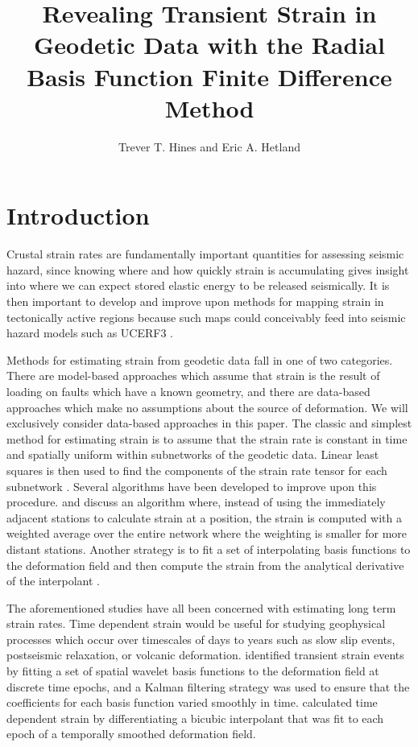 \documentclass[10pt,a4paper]{article}
\title{Revealing Transient Strain in Geodetic Data with the Radial Basis Function Finite Difference Method}
\author{Trever T. Hines and Eric A. Hetland}
\begin{document}
\maketitle


\section{Introduction}\label{sec:Introduction}
Crustal strain rates are fundamentally important quantities for assessing seismic hazard, since knowing where and how quickly strain is accumulating gives insight into where we can expect stored elastic energy to be released seismically.  It is then important to develop and improve upon methods for mapping strain in tectonically active regions because such maps could conceivably feed into seismic hazard models such as UCERF3 \citep{Field2014}. 

Methods for estimating strain from geodetic data fall in one of two categories.  There are model-based approaches which assume that strain is the result of loading on faults which have a known geometry, and there are data-based approaches which make no assumptions about the source of deformation.  We will exclusively consider data-based approaches in this paper.  The classic and simplest method for estimating strain is to assume that the strain rate is constant in time and spatially uniform within subnetworks of the geodetic data.  Linear least squares is then used to find the components of the strain rate tensor for each subnetwork \citep[e.g][]{Frank1966,Prescott1976,Savage1986,Feigl1990,Murray2000}. Several algorithms have been developed to improve upon this procedure. \citet{Shen1996} and \citet{Shen2015} discuss an algorithm where, instead of using the immediately adjacent stations to calculate strain at a position, the strain is computed with a weighted average over the entire network where the weighting is smaller for more distant stations.  Another strategy is to fit a set of interpolating basis functions to the deformation field and then compute the strain from the analytical derivative of the interpolant \citep[e.g.][]{Beavan2001,Tape2009,Sandwell2016}.  

The aforementioned studies have all been concerned with estimating long term strain rates. Time dependent strain would be useful for studying geophysical processes which occur over timescales of days to years such as slow slip events, postseismic relaxation, or volcanic deformation.  \citet{Ohtani2010} identified transient strain events by fitting a set of spatial wavelet basis functions to the deformation field at discrete time epochs, and a Kalman filtering strategy was used to ensure that the coefficients for each basis function varied smoothly in time. \citet{Holt2013} calculated time dependent strain by differentiating a bicubic interpolant that was fit to each epoch of a temporally smoothed deformation field. 
\end{document}
